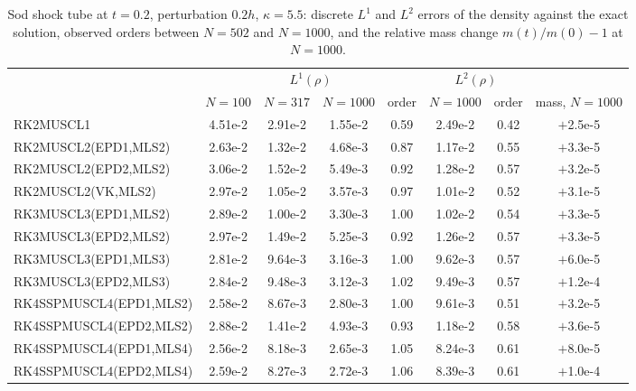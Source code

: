 \documentclass[smallextended]{svjour3}
\numberwithin{equation}{section}
\begin{document}
\begin{table}[!htbp]
\centering
\caption{Sod shock tube at $t=0.2$, perturbation $0.2h$, $\kappa=5.5$: discrete $L^1$ and $L^2$ errors of the density against the exact solution, observed orders between $N=502$ and $N=1000$, and the relative mass change $m(t)/m(0)-1$ at $N=1000$.}\label{tab:sod}
\footnotesize
\setlength{\tabcolsep}{4pt}
\begin{adjustbox}{max width=\textwidth}
\begin{tabular}{lccccccc}
\toprule
& \multicolumn{4}{c}{$L^1(\rho)$} & \multicolumn{2}{c}{$L^2(\rho)$} & \\
\cmidrule(lr){2-5}\cmidrule(lr){6-7}
& $N=100$ & $N=317$ & $N=1000$ & order & $N=1000$ & order & mass, $N=1000$\\
\midrule
RK2MUSCL1 & 4.51e-2 & 2.91e-2 & 1.55e-2 & 0.59 & 2.49e-2 & 0.42 & $+$2.5e-5\\
RK2MUSCL2(EPD1,MLS2) & 2.63e-2 & 1.32e-2 & 4.68e-3 & 0.87 & 1.17e-2 & 0.55 & $+$3.3e-5\\
RK2MUSCL2(EPD2,MLS2) & 3.06e-2 & 1.52e-2 & 5.49e-3 & 0.92 & 1.28e-2 & 0.57 & $+$3.2e-5\\
RK2MUSCL2(VK,MLS2) & 2.97e-2 & 1.05e-2 & 3.57e-3 & 0.97 & 1.01e-2 & 0.52 & $+$3.1e-5\\
RK3MUSCL3(EPD1,MLS2) & 2.89e-2 & 1.00e-2 & 3.30e-3 & 1.00 & 1.02e-2 & 0.54 & $+$3.3e-5\\
RK3MUSCL3(EPD2,MLS2) & 2.97e-2 & 1.49e-2 & 5.25e-3 & 0.92 & 1.26e-2 & 0.57 & $+$3.3e-5\\
RK3MUSCL3(EPD1,MLS3) & 2.81e-2 & 9.64e-3 & 3.16e-3 & 1.00 & 9.62e-3 & 0.57 & $+$6.0e-5\\
RK3MUSCL3(EPD2,MLS3) & 2.84e-2 & 9.48e-3 & 3.12e-3 & 1.02 & 9.49e-3 & 0.57 & $+$1.2e-4\\
RK4SSPMUSCL4(EPD1,MLS2) & 2.58e-2 & 8.67e-3 & 2.80e-3 & 1.00 & 9.61e-3 & 0.51 & $+$3.2e-5\\
RK4SSPMUSCL4(EPD2,MLS2) & 2.88e-2 & 1.41e-2 & 4.93e-3 & 0.93 & 1.18e-2 & 0.58 & $+$3.6e-5\\
RK4SSPMUSCL4(EPD1,MLS4) & 2.56e-2 & 8.18e-3 & 2.65e-3 & 1.05 & 8.24e-3 & 0.61 & $+$8.0e-5\\
RK4SSPMUSCL4(EPD2,MLS4) & 2.59e-2 & 8.27e-3 & 2.72e-3 & 1.06 & 8.39e-3 & 0.61 & $+$1.0e-4\\
\bottomrule
\end{tabular}
\end{adjustbox}
\end{table}
\end{document}

